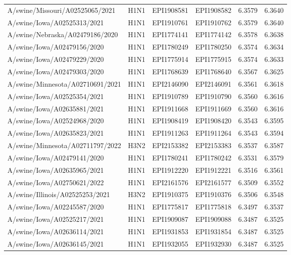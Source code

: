 \begin{tabular}{L{1.95in}|L{.25in}|L{.60in}|L{.6in}|C{1in}|C{1in}}
 A/swine/Missouri/A02525065/2021 &H1N1&EPI1908581&EPI1908582&6.3579&6.3640\\
 A/swine/Iowa/A02525313/2021 &H1N1&EPI1910761&EPI1910762&6.3579&6.3640\\
 A/swine/Nebraska/A02479186/2020 &H1N1&EPI1774141&EPI1774142&6.3578&6.3638\\
 A/swine/Iowa/A02479156/2020 &H1N1&EPI1780249&EPI1780250&6.3574&6.3634\\
 A/swine/Iowa/A02479229/2020 &H1N1&EPI1775914&EPI1775915&6.3574&6.3633\\
 A/swine/Iowa/A02479303/2020 &H1N1&EPI1768639&EPI1768640&6.3567&6.3625\\
 A/swine/Minnesota/A02710691/2021 &H1N1&EPI2146090&EPI2146091&6.3561&6.3618\\
 A/swine/Iowa/A02525354/2021 &H1N1&EPI1910789&EPI1910790&6.3560&6.3616\\
 A/swine/Iowa/A02635881/2021 &H1N1&EPI1911668&EPI1911669&6.3560&6.3616\\
 A/swine/Iowa/A02524968/2020 &H1N1&EPI1908419&EPI1908420&6.3543&6.3595\\
 A/swine/Iowa/A02635823/2021 &H1N1&EPI1911263&EPI1911264&6.3543&6.3594\\
 A/swine/Minnesota/A02711797/2022 &H3N2&EPI2153382&EPI2153383&6.3537&6.3587\\
 A/swine/Iowa/A02479141/2020 &H1N1&EPI1780241&EPI1780242&6.3531&6.3579\\
 A/swine/Iowa/A02635965/2021 &H1N1&EPI1912220&EPI1912221&6.3516&6.3561\\
 A/swine/Iowa/A02750621/2022 &H1N1&EPI2161576&EPI2161577&6.3509&6.3552\\
 A/swine/Illinois/A02525253/2021 &H3N2&EPI1910375&EPI1910376&6.3506&6.3548\\
 A/swine/Iowa/A02245587/2020 &H1N1&EPI1775817&EPI1775818&6.3497&6.3537\\
 A/swine/Iowa/A02525217/2021 &H1N1&EPI1909087&EPI1909088&6.3487&6.3525\\
 A/swine/Iowa/A02636114/2021 &H1N1&EPI1931853&EPI1931854&6.3487&6.3525\\
 A/swine/Iowa/A02636145/2021 &H1N1&EPI1932055&EPI1932930&6.3487&6.3525\\

\end{tabular}
